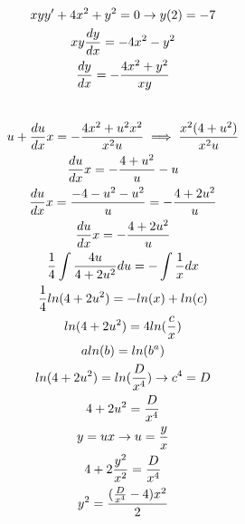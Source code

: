 \documentclass{article}
\begin{document}
\begin{gather*}
x y y'+4x^{2}+y^{2}=0   \rightarrow  y(2) = -7 \\
xy\frac{dy}{dx} = -4x^{2}-y^{2} \\
\frac{dy}{dx} = -\frac{4x^{2}+y^{2}}{xy} \\
\vspace{0.5em} \\
u + \frac{du}{dx}x= -\frac{4x^{2}+u^{2}x^{2}}{x^{2}u} \implies \frac{x^{2}(4+u^{2})}{x^{2}u} \\
\frac{du}{dx}x = -\frac{4+u^{2}}{u}-u \\
\frac{du}{dx}x = \frac{-4-u^{2}-u^{2}}{u} = -\frac{4+2u^{2}}{u} \\
\frac{du}{dx}x =-\frac{4+2u^{2}}{u} \\
\frac{1}{4}\int \frac{4u}{4+2u^{2}}du = -\int \frac{1}{x}dx \\
\frac{1}{4}ln(4+2u^{2}) = -ln(x) +ln(c) \\
ln(4+2u^{2}) = 4ln(\frac{c}{x}) \\
aln(b) = ln(b^{a}) \\
ln(4+2u^{2}) = ln(\frac{D}{x^{4}})  \rightarrow   c^{4} =D \\
4+2u^{2} = \frac{D}{x^{4}} \\
y = ux  \rightarrow u = \frac{y}{x} \\
4+2\frac{y^{2}}{x^{2}} = \frac{D}{x^{4}} \\
y^{2} =\frac{(\frac{D}{x^{4}}-4)x^{2}}{2}
\end{gather*}
\end{document}
